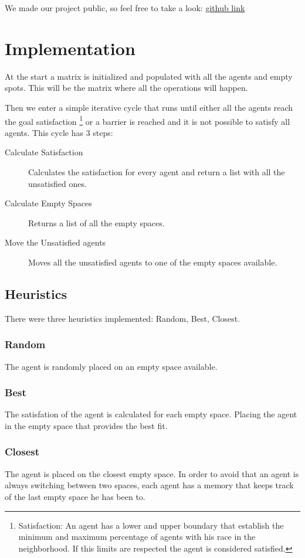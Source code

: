 \documentclass[a4paper,titlepage,11pt]{article}
\begin{document}
We made our project public, so feel free to take a look:
\href{https://github.com/BCasaleiro/schelling-model-segregation}{github link}

\newpage

\section{Implementation}
At the start a matrix is initialized and populated with all the agents and empty spots.
This will be the matrix where all the operations will happen.

Then we enter a simple iterative cycle that runs until either all the agents reach the goal satisfaction
\footnote{Satisfaction: An agent has a lower and upper boundary that establish the minimum and maximum
percentage of agents with his race in the neighborhood. If this limits are respected the agent is considered
satisfied.}
or a barrier is reached and it is not possible to satisfy all agents. 
This cycle has 3 steps:

\begin{description}
\item [ Calculate Satisfaction ] Calculates the satisfaction for every agent and return a list with all the unsatisfied ones.
\item [ Calculate Empty Spaces ] Returns a list of all the empty spaces.
\item [ Move the Unsatisfied agents ] Moves all the unsatisfied agents to one of the empty spaces available.
\end{description}

\subsection{Heuristics}
There were three heuristics implemented: Random, Best, Closest.

\subsubsection{Random}
The agent is randomly placed on an empty space available.

\subsubsection{Best}
The satisfation of the agent is calculated for each empty space.
Placing the agent in the empty space that provides the best fit.

\subsubsection{Closest}
The agent is placed on the closest empty space.
In order to avoid that an agent is always switching between two spaces,
each agent has a memory that keeps track of the last empty space he has been to.
\end{document}
